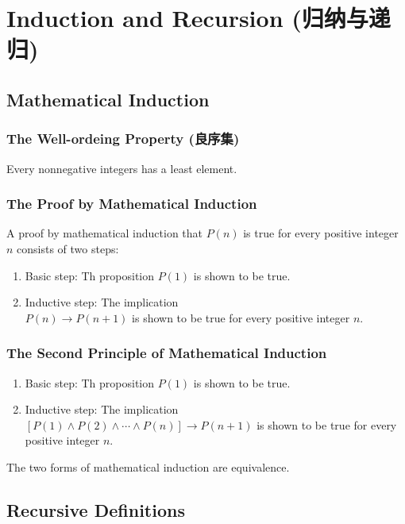 \section[Induction and Recursion]{Induction and Recursion (归纳与递归)}

\subsection{Mathematical Induction}
\subsubsection{The Well-ordeing Property (良序集)}

Every nonnegative integers has a least element. 

\subsubsection{The Proof by Mathematical Induction}
A proof by mathematical induction that $P(n)$ is true for every positive integer $n$ consists of two steps: 
\begin{enumerate}
    \item Basic step: Th proposition $P(1)$ is shown to be true. 
    \item Inductive step: The implication \\$P(n) \longrightarrow P(n+1)$ is shown to be true for every positive integer $n$. 
\end{enumerate}

\subsubsection{The Second Principle of Mathematical Induction}
\begin{enumerate}
    \item Basic step: Th proposition $P(1)$ is shown to be true. 
    \item Inductive step: The implication \\ $\left[P(1)\land P(2) \land\cdots\land P(n)\right] \longrightarrow P(n+1)$ is shown to be true for every positive integer $n$. 
\end{enumerate}

The two forms of mathematical induction are equivalence. 

\subsection{Recursive Definitions}

